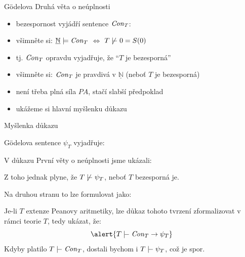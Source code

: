 \documentclass{beamer}
\begin{document}
\begin{frame}{Gödelova Druhá věta o neúplnosti}
    
    \pause

    \pause
    \begin{itemize}
        \item bezespornost vyjádří sentence \alert{$\mathit{Con}_T$}:\hfill {} \pause 
        \item všimněte si: $\underline{\mathbb N}\models\mathit{Con}_T$ $\Leftrightarrow$ $T\not\proves 0=S(0)$\pause
        \item tj. $\mathit{Con}_T$ opravdu vyjadřuje, že \alert{``$T$ je bezesporná''}
    \end{itemize}

    \bigskip
    \pause

    \medskip

    \pause
    \begin{itemize}
        \item všimněte si: \alert{$\mathit{Con}_T$ je pravdivá v $\underline{\mathbb N}$} (neboť $T$ je bezesporná)\pause
        \item není třeba plná síla $PA$, stačí slabší předpoklad\pause
        \item ukážeme si hlavní myšlenku důkazu
    \end{itemize}
    
\end{frame}


\begin{frame}{Myšlenka důkazu}

    \pause
    Gödelova sentence $\psi_T$ vyjadřuje: 
    
    \pause
    V důkazu První věty o neúplnosti jsme ukázali:

    
    \pause
    Z toho jednak plyne, že $T\not\proves\psi_T$, neboť $T$ bezesporná je. 
    
    \pause
    Na druhou stranu to lze formulovat jako: 
    
    \pause
    Je-li $T$ extenze Peanovy aritmetiky, lze důkaz tohoto tvrzení zformalizovat v rámci teorie $T$, tedy ukázat, že:
    $$
    \alert{ T\proves\Con_T\to\psi_T}
    $$
    \pause
    Kdyby platilo $T\proves\Con_T$, dostali bychom i $T\proves\psi_T$, což je spor.
    \hfill\qedsymbol

\end{frame}
\end{document}
